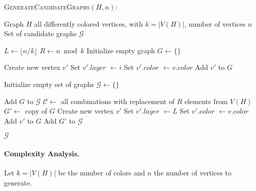 \begin{algorithm}[H]
    \caption{\textsc{GenerateCandidateGraphs}$(H, n)$:}
    \label{alg:balanced-coloring}
    \begin{algorithmic}[1]
    \Require Graph $H$ all differently colored vertices, with $k = |V(H)|$, number of vertices $n$
    \Ensure Set of candidate graphs $\mathcal{G}$
    
    \State $L \gets \lfloor n / k \rfloor$ 
    \State $R \gets n \bmod k$ 
    \State Initialize empty graph $G \gets \{\}$
    
            \State Create new vertex $v'$
            \State Set $v'.layer$ $\gets i$
            \State Set $v'.color$  $\gets v.color$
            \State Add $v'$ to $G$
        \EndFor
    \EndFor
    
    \State Initialize empty set of graphs $\mathcal{G} \gets \{\}$
    
        \State Add $G$ to $\mathcal{G}$ 
    \Else
        \State $\mathcal{C} \gets$ all combinations with replacement of $R$ elements from $V(H)$
            \State $G' \gets$ copy of $G$
                \State Create new vertex $v'$
                \State Set $v'.layer$ $\gets L$
                \State Set $v'.color$  $\gets v.color$
                \State Add $v'$ to $G$
            \EndFor
            \State Add $G'$ to $\mathcal{G}$
        \EndFor
    \EndIf
    
    \State \Return $\mathcal{G}$
    \end{algorithmic}
\end{algorithm}
    
\paragraph{Complexity Analysis.}
Let \( k = |V(H)| \) be the number of colors and \( n \) the number of vertices to generate.

